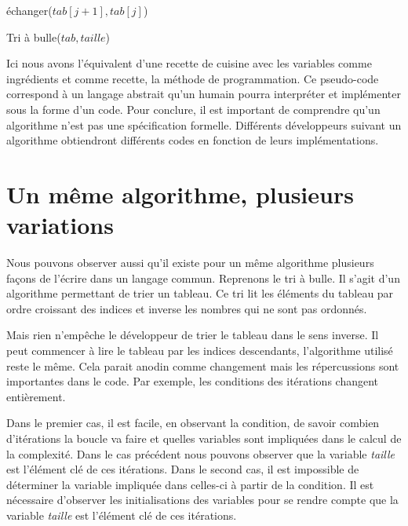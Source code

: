 \documentclass[12pt, twoside, openright]{report}
\begin{document}
\begin{algorithm}[H]
    
    
    {
        {
            {
                échanger($tab[j+1], tab[j]$)
            }
        }
    }
    \caption{Tri à bulle($tab, taille$)}
\end{algorithm}
 \vspace{0.4cm}
Ici nous avons l'équivalent d'une recette de cuisine avec les variables comme ingrédients et comme recette, la méthode de programmation. Ce pseudo-code correspond à un langage abstrait qu'un humain pourra interpréter et implémenter sous la forme d'un code. Pour conclure, il est important de comprendre qu'un algorithme n'est pas une spécification formelle. Différents développeurs suivant un algorithme obtiendront différents codes en fonction de leurs implémentations.

\section{Un même algorithme, plusieurs variations}

Nous pouvons observer aussi qu'il existe pour un même algorithme plusieurs façons de l'écrire dans un langage commun. Reprenons le tri à bulle. Il s'agit d'un algorithme permettant de trier un tableau. Ce tri lit les éléments du tableau par ordre croissant des indices et inverse les nombres qui ne sont pas ordonnés.



Mais rien n'empêche le développeur de trier le tableau dans le sens inverse. Il peut commencer à lire le tableau par les indices descendants, l'algorithme utilisé reste le même. Cela parait anodin comme changement mais les répercussions sont importantes dans le code. Par exemple, les conditions des itérations changent entièrement.



Dans le premier cas, il est facile, en observant la condition, de savoir combien d'itérations la boucle va faire et quelles variables sont impliquées dans le calcul de la complexité. Dans le cas précédent nous pouvons observer que la variable \textit{taille} est l'élément clé de ces itérations. Dans le second cas, il est impossible de déterminer la variable impliquée dans celles-ci à partir de la condition. Il est nécessaire d'observer les initialisations des variables pour se rendre compte que la variable \textit{taille} est l'élément clé de ces itérations.
\end{document}
